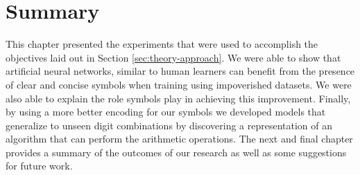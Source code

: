 \section{Summary} \label{sec:empirical-studies-summary}

This chapter presented the experiments that were used to accomplish the objectives laid out in Section \ref{sec:theory-approach}. We were able to show that artificial neural networks, similar to human learners can benefit from the presence of clear and concise symbols when training using impoverished datasets. We were also able to explain the role symbols play in achieving this improvement. Finally, by using a more better encoding for our symbols we developed models that generalize to unseen digit combinations by discovering a representation of an algorithm that can perform the arithmetic operations. The next and final chapter provides a summary of the outcomes of our research as well as some suggestions for future work.